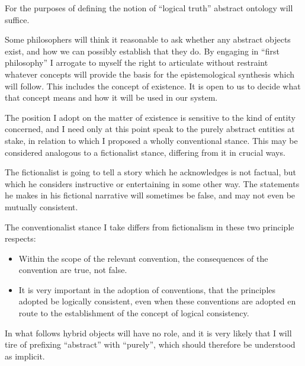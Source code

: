 \documentclass[10pt,titlepage]{book}
\begin{document}
For the purposes of defining the notion of ``logical truth'' abstract ontology will suffice.

Some philosophers will think it reasonable to ask whether any abstract objects exist, and how we can possibly establish that they do.
By engaging in ``first philosophy'' I arrogate to myself the right to articulate without restraint whatever concepts will provide the basis for the epistemological synthesis which will follow.
This includes the concept of existence.
It is open to us to decide what that concept means and how it will be used in our system.

The position I adopt on the matter of existence is sensitive to the kind of entity concerned, and I need only at this point speak to the purely abstract entities at stake, in relation to which I proposed a wholly conventional stance.
This may be considered analogous to a fictionalist stance, differing from it in crucial ways.

The fictionalist is going to tell a story which he acknowledges is not factual, but which he considers instructive or entertaining in some other way.
The statements he makes in his fictional narrative will sometimes be false, and may not even be mutually consistent.

The conventionalist stance I take differs from fictionalism in these two principle respects:

\begin{itemize}
\item Within the scope of the relevant convention, the consequences of the convention are true, not false.
\item It is very important in the adoption of conventions, that the principles adopted be logically consistent, even when these conventions are adopted en route to the establishment of the concept of logical consistency.
\end{itemize}

In what follows hybrid objects will have no role, and it is very likely that I will tire of prefixing ``abstract'' with ``purely'', which should therefore be understood as implicit.
\end{document}
